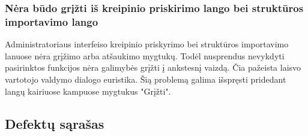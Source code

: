 	\subsubsection{Nėra būdo grįžti iš kreipinio priskirimo lango bei struktūros importavimo lango}
	
		Administratoriaus interfeiso kreipinio priskyrimo bei struktūros importavimo lanuose nėra grįžimo arba atšaukimo mygtukų.
		Todėl nusprendus nevykdyti pasirinktos funkcijos nėra galimybės grįžti į ankstesnį vaizdą.
		Čia pažeista laisvo vartotojo valdymo dialogo euristika.
		Šią problemą galima išspręsti pridedant langų kairiuose kampuose mygtukus "Grįžti".
	
\subsection{Defektų sąrašas}
	
